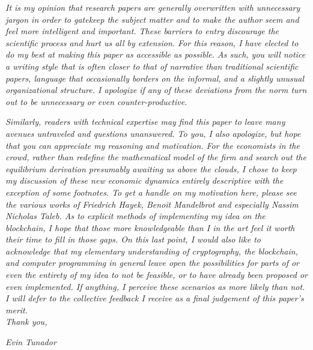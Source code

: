 \documentclass{article}[10pt]
\begin{document}
\textit{It is my opinion that research papers are generally overwritten with unnecessary jargon in order to gatekeep the subject matter and to make the author seem and feel more intelligent and important. 
These barriers to entry discourage the scientific process and hurt us all by extension. 
For this reason, I have elected to do my best at making this paper as accessible as possible. 
As such, you will notice a writing style that is often closer to that of narrative than traditional scientific papers, language that occasionally borders on the informal, and a slightly unusual organizational structure. 
I apologize if any of these deviations from the norm turn out to be unnecessary or even counter-productive. } \par

\textit{Similarly, readers with technical expertise may find this paper to leave many avenues untraveled and questions unanswered. 
To you, I also apologize, but hope that you can appreciate my reasoning and motivation. 
For the economists in the crowd, rather than redefine the mathematical model of the firm and search out the equilibrium derivation presumably awaiting us above the clouds, I chose to keep my discussion of these new economic dynamics entirely descriptive with the exception of some footnotes. 
To get a handle on my motivation here, please see the various works of Friedrich Hayek, Benoit Mandelbrot and especially Nassim Nicholas Taleb. 
As to explicit methods of implementing my idea on the blockchain, I hope that those more knowledgeable than I in the art feel it worth their time to fill in those gaps.
On this last point, I would also like to acknowledge that my elementary understanding of cryptography, the blockchain, and computer programming in general leave open the possibilities for parts of or even the entirety of my idea to not be feasible, or to have already been proposed or even implemented. 
If anything, I perceive these scenarios as more likely than not. 
I will defer to the collective feedback I receive as a final judgement of this paper's merit.} \\

\textit{Thank you,}\par
\textit{Evin Tunador}

\newpage
\tableofcontents
\newpage
\end{document}
